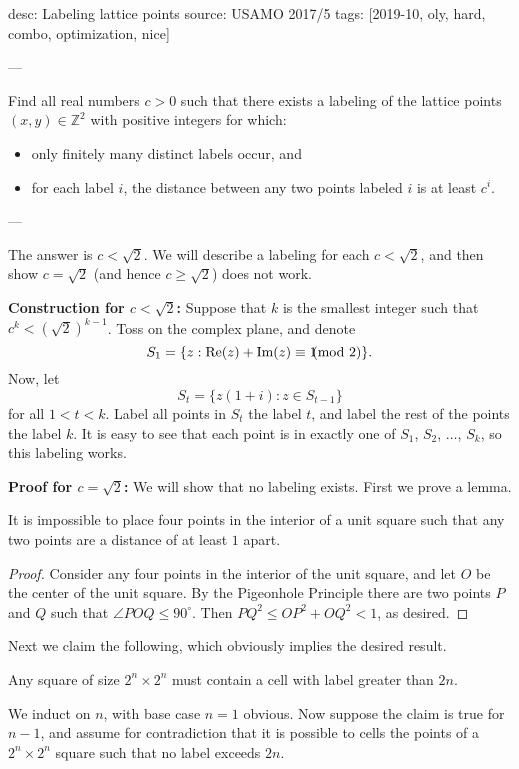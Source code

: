 desc: Labeling lattice points
source: USAMO 2017/5
tags: [2019-10, oly, hard, combo, optimization, nice]

---

Find all real numbers $c>0$ such that there exists a labeling of the lattice points $(x,y)\in\mathbb Z^2$ with positive integers for which:
\begin{itemize}[itemsep=0em]
    \item only finitely many distinct labels occur, and
    \item for each label $i$, the distance between any two points labeled $i$ is at least $c^i$.
\end{itemize}

---

The answer is $c<\sqrt2$. We will describe a labeling for each $c<\sqrt2$, and then show $c=\sqrt2$ (and hence $c\ge\sqrt2$) does not work.

\bigskip

\textbf{Construction for $c<\sqrt2$:} Suppose that $k$ is the smallest integer such that $c^k<(\sqrt2)^{k-1}$. Toss on the complex plane, and denote \[S_1=\{z:\text{Re}(z)+\text{Im}(z)\equiv 1\hspace{-0.75em}\pmod2\}.\]
Now, let \[S_t=\{z(1+i):z\in S_{t-1}\}\]
for all $1<t<k$. Label all points in $S_t$ the label $t$, and label the rest of the points the label $k$. It is easy to see that each point is in exactly one of $S_1$, $S_2$, $\ldots$, $S_k$, so this labeling works.

\bigskip

\textbf{Proof for $c=\sqrt2$:} We will show that no labeling exists. First we prove a lemma.
\begin{lemma*}
    It is impossible to place four points in the interior of a unit square such that any two points are a distance of at least $1$ apart.
\end{lemma*}
\begin{proof}
    Consider any four points in the interior of the unit square, and let $O$ be the center of the unit square. By the Pigeonhole Principle there are two points $P$ and $Q$ such that $\angle POQ\le90^\circ$. Then $PQ^2\le OP^2+OQ^2<1$, as desired.
\end{proof}

Next we claim the following, which obviously implies the desired result.
\begin{claim*}
    Any square of size $2^n\times2^n$ must contain a cell with label greater than $2n$.
\end{claim*}
We induct on $n$, with base case $n=1$ obvious. Now suppose the claim is true for $n-1$, and assume for contradiction that it is possible to cells the points of a $2^n\times2^n$ square such that no label exceeds $2n$.


